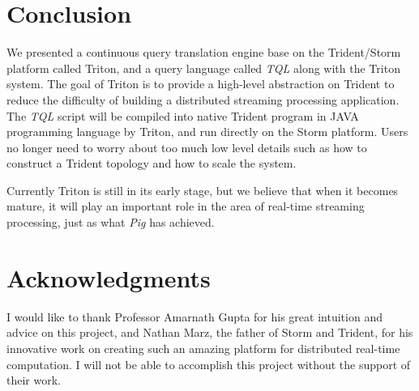 \documentclass[conference, twocolumn, 11pt]{IEEEtran}
\theoremstyle{definition}
\begin{document}
\section{Conclusion}
We presented a continuous query translation engine base on the Trident/Storm platform called Triton, and a query language called \emph{TQL} along with the Triton system. The goal of Triton is to provide a high-level abstraction on Trident to reduce the difficulty of building a distributed streaming processing application. The \emph{TQL} script will be compiled into native Trident program in JAVA programming language by Triton, and run directly on the Storm platform. Users no longer need to worry about too much low level details such as how to construct a Trident topology and how to scale the system.

Currently Triton is still in its early stage, but we believe that when it becomes mature, it will play an important role in the area of real-time streaming processing, just as what \emph{Pig} has achieved.


\section*{Acknowledgments}
I would like to thank Professor Amarnath Gupta for his great intuition and advice on this project,
and Nathan Marz, the father of Storm and Trident, for his innovative work on creating such an amazing platform for distributed real-time computation.
I will not be able to accomplish this project without the support of their work.


\end{document}
